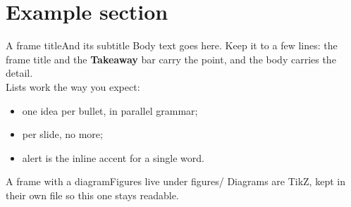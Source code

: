\section{Example section}

\begin{frame}{A frame title}{And its subtitle}
  Body text goes here. Keep it to a few lines: the frame title and the
  \textbf{Takeaway} bar carry the point, and the body carries the detail.
  \\[0.7em]
  Lists work the way you expect:
  \begin{itemize}
    \item one idea per bullet, in parallel grammar;
    \item {} per slide, no more;
    \item \alert{alert} is the inline accent for a single word.
  \end{itemize}
\end{frame}

\begin{frame}{A frame with a diagram}{Figures live under figures/}
  Diagrams are TikZ, kept in their own file so this one stays readable.
  \begin{center}
    
  \end{center}
\end{frame}

